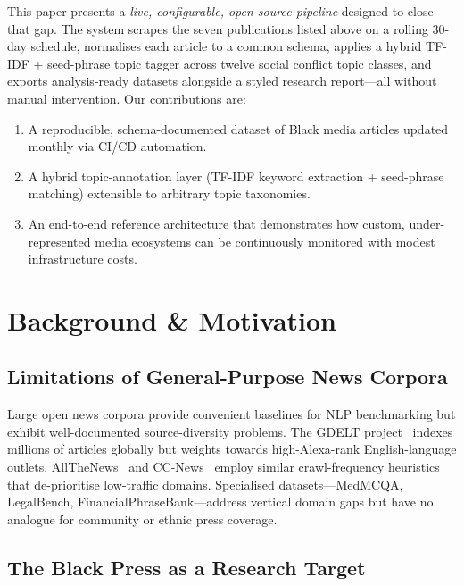 \documentclass[sigconf,anonymous]{acmart}
\begin{document}
This paper presents a \emph{live, configurable, open-source pipeline} designed
to close that gap.
The system scrapes the seven publications listed above on a rolling 30-day
schedule, normalises each article to a common schema, applies a hybrid
TF-IDF + seed-phrase topic tagger across twelve social conflict topic classes,
and exports analysis-ready datasets alongside a styled research report---all
without manual intervention.
Our contributions are:

\begin{enumerate}
  \item A reproducible, schema-documented dataset of Black media articles updated
        monthly via CI/CD automation.
  \item A hybrid topic-annotation layer (TF-IDF keyword extraction + seed-phrase
        matching) extensible to arbitrary topic taxonomies.
  \item An end-to-end reference architecture that demonstrates how custom,
        under-represented media ecosystems can be continuously monitored with
        modest infrastructure costs.
\end{enumerate}

\section{Background \& Motivation}

\subsection{Limitations of General-Purpose News Corpora}

Large open news corpora provide convenient baselines for NLP benchmarking but
exhibit well-documented source-diversity problems.
The GDELT project~\cite{leetaru2013gdelt} indexes millions of articles globally
but weights towards high-Alexa-rank English-language outlets.
AllTheNews~\cite{trhlik2024quantifying} and CC-News~\cite{baack2024critical}
employ similar crawl-frequency heuristics that de-prioritise low-traffic domains.
Specialised datasets---MedMCQA, LegalBench, FinancialPhraseBank---address vertical
domain gaps but have no analogue for community or ethnic press coverage.

\subsection{The Black Press as a Research Target}
\end{document}
